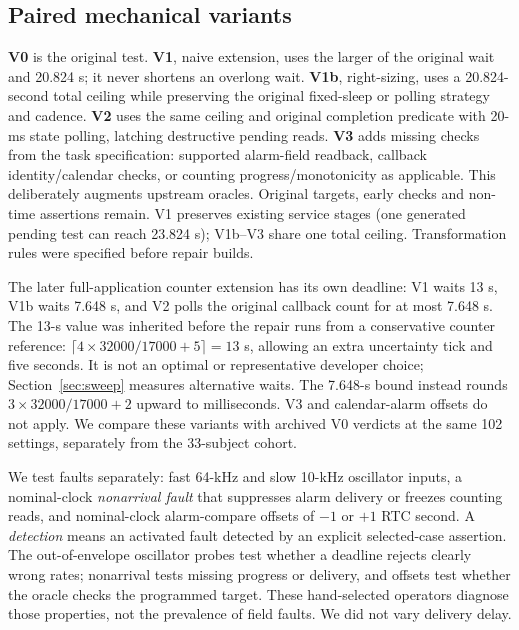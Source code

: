 \documentclass[sigconf,nonacm,balance=false]{acmart}
\begin{document}
\subsection{Paired mechanical variants}
\textbf{V0} is the original test. \textbf{V1}, naive extension, uses the larger of the original wait and 20.824 s; it never shortens an overlong wait. \textbf{V1b}, right-sizing, uses a 20.824-second total ceiling while preserving the original fixed-sleep or polling strategy and cadence. \textbf{V2} uses the same ceiling and original completion predicate with 20-ms state polling, latching destructive pending reads. \textbf{V3} adds missing checks from the task specification: supported alarm-field readback, callback identity/calendar checks, or counting progress/monotonicity as applicable. This deliberately augments upstream oracles. Original targets, early checks and non-time assertions remain. V1 preserves existing service stages (one generated pending test can reach 23.824 s); V1b--V3 share one total ceiling. Transformation rules were specified before repair builds.

The later full-application counter extension has its own deadline: V1 waits 13 s, V1b waits 7.648 s, and V2 polls the original callback count for at most 7.648 s. The 13-s value was inherited before the repair runs from a conservative counter reference: $\lceil4\times32000/17000+5\rceil=13$ s, allowing an extra uncertainty tick and five seconds. It is not an optimal or representative developer choice; Section~\ref{sec:sweep} measures alternative waits. The 7.648-s bound instead rounds $3\times32000/17000+2$ upward to milliseconds. V3 and calendar-alarm offsets do not apply. We compare these variants with archived V0 verdicts at the same 102 settings, separately from the 33-subject cohort.

We test faults separately: fast 64-kHz and slow 10-kHz oscillator inputs, a nominal-clock \emph{nonarrival fault} that suppresses alarm delivery or freezes counting reads, and nominal-clock alarm-compare offsets of $-1$ or $+1$ RTC second. A \emph{detection} means an activated fault detected by an explicit selected-case assertion. The out-of-envelope oscillator probes test whether a deadline rejects clearly wrong rates; nonarrival tests missing progress or delivery, and offsets test whether the oracle checks the programmed target. These hand-selected operators diagnose those properties, not the prevalence of field faults. We did not vary delivery delay.
\end{document}
